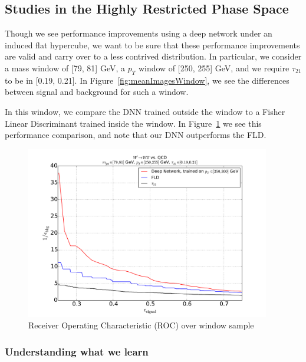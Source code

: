 \subsection{Studies in the Highly Restricted Phase Space} %
\label{sub:small_window_studies}

Though we see performance improvements using a deep network under an induced flat hypercube, we want to be sure that these performance improvements are valid and carry over to a less contrived distribution. In particular, we consider a mass window of [79, 81] GeV, a $p_T$ window of [250, 255] GeV, and we require $\tau_21$ to be in [0.19, 0.21]. In Figure~\ref{fig:meanImagesWindow}, we see the differences between signal and background for such a window.




In this window, we compare the DNN trained outside the window to a Fisher Linear Discriminant trained inside the window. In Figure~\ref{fig:rocWindow} we see this performance comparison, and note that our DNN outperforms the FLD.

\begin{figure}[htbp]
  \centering
  \includegraphics[width=0.95\textwidth]{figures/augwindow-roc.pdf}
  \caption{Receiver Operating Characteristic (ROC) over window sample}
  \label{fig:rocWindow}
\end{figure}

\subsubsection{Understanding what we learn} %
\label{ssub:understanding_what_we_learn}

